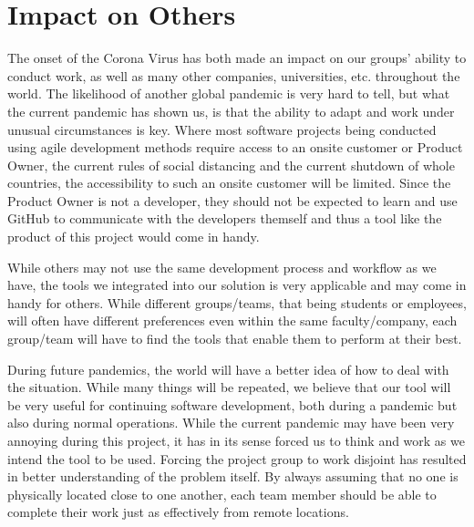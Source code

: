 \section{Impact on Others}\label{sec:impactOnOthers}
The onset of the Corona Virus has both made an impact on our groups' ability to conduct work, as well as many other companies, universities, etc. throughout the world.
The likelihood of another global pandemic is very hard to tell, but what the current pandemic has shown us, is that the ability to adapt and work under unusual circumstances is key.
Where most software projects being conducted using agile development methods require access to an onsite customer or Product Owner, the current rules of social distancing and the current shutdown of whole countries, the accessibility to such an onsite customer will be limited.
Since the Product Owner is not a developer, they should not be expected to learn and use GitHub to communicate with the developers themself and thus a tool like the product of this project would come in handy.

While others may not use the same development process and workflow as we have, the tools we integrated into our solution is very applicable and may come in handy for others.
While different groups/teams, that being students or employees, will often have different preferences even within the same faculty/company, each group/team will have to find the tools that enable them to perform at their best.

During future pandemics, the world will have a better idea of how to deal with the situation.
While many things will be repeated, we believe that our tool will be very useful for continuing software development, both during a pandemic but also during normal operations.
While the current pandemic may have been very annoying during this project, it has in its sense forced us to think and work as we intend the tool to be used.
Forcing the project group to work disjoint has resulted in better understanding of the problem itself.
By always assuming that no one is physically located close to one another, each team member should be able to complete their work just as effectively from remote locations.
